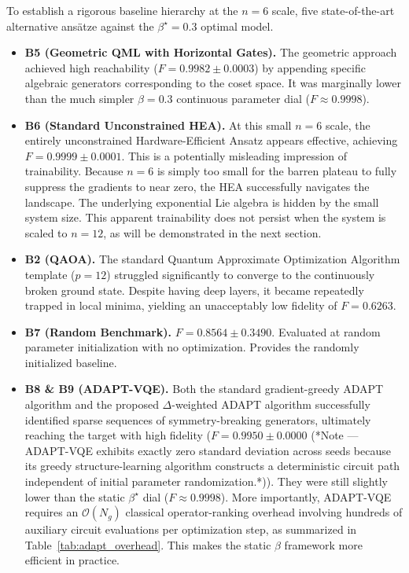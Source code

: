 \documentclass[10pt,twocolumn]{article}
\theoremstyle{remark}
\begin{document}
To establish a rigorous baseline hierarchy at the $n=6$ scale, five state-of-the-art alternative ans\"atze against the $\beta^\star = 0.3$ optimal model.
\begin{itemize}
    \item \textbf{B5 (Geometric QML with Horizontal Gates).} The geometric approach achieved high reachability ($F=0.9982 \pm 0.0003$) by appending specific algebraic generators corresponding to the coset space. It was marginally lower than the much simpler $\beta=0.3$ continuous parameter dial ($F \approx 0.9998$).
    \item \textbf{B6 (Standard Unconstrained HEA).} At this small $n=6$ scale, the entirely unconstrained Hardware-Efficient Ansatz appears effective, achieving $F=0.9999 \pm 0.0001$. This is a potentially misleading impression of trainability. Because $n=6$ is simply too small for the barren plateau to fully suppress the gradients to near zero, the HEA successfully navigates the landscape. The underlying exponential Lie algebra is hidden by the small system size. This apparent trainability does not persist when the system is scaled to $n=12$, as will be demonstrated in the next section.
    \item \textbf{B2 (QAOA).} The standard Quantum Approximate Optimization Algorithm template ($p=12$) struggled significantly to converge to the continuously broken ground state. Despite having deep layers, it became repeatedly trapped in local minima, yielding an unacceptably low fidelity of $F=0.6263$.
    \item \textbf{B7 (Random Benchmark).} $F=0.8564 \pm 0.3490$. Evaluated at random parameter initialization with no optimization. Provides the randomly initialized baseline.
    \item \textbf{B8 \& B9 (ADAPT-VQE).} Both the standard gradient-greedy ADAPT algorithm and the proposed $\Delta$-weighted ADAPT algorithm successfully identified sparse sequences of symmetry-breaking generators, ultimately reaching the target with high fidelity ($F=0.9950 \pm 0.0000$ (*Note --- ADAPT-VQE exhibits exactly zero standard deviation across seeds because its greedy structure-learning algorithm constructs a deterministic circuit path independent of initial parameter randomization.*)). They were still slightly lower than the static $\beta^\star$ dial ($F \approx 0.9998$). More importantly, ADAPT-VQE requires an $\mathcal{O}(N_g)$ classical operator-ranking overhead involving hundreds of auxiliary circuit evaluations per optimization step, as summarized in Table~\ref{tab:adapt_overhead}. This makes the static $\beta$ framework more efficient in practice.
\end{itemize}
\end{document}
